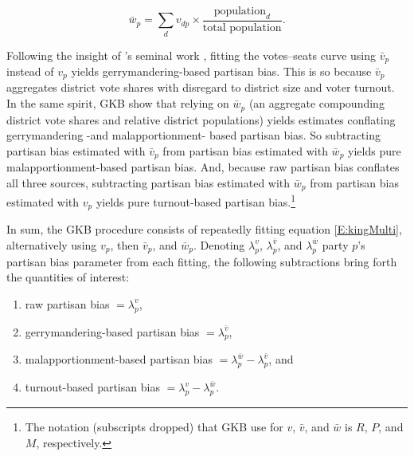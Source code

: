\documentclass[letter,12pt]{article}
\begin{document}
\begin{equation}
\bar{w}_p  = \sum_d v_{dp} \times \frac{\text{population}_d}{\text{total population}}. %
\end{equation}


Following the insight of \citeauthor{tufte1973seatsVotes}'s \citeyearpar{tufte1973seatsVotes} seminal work \citep[further elaborated in][]{gelman.king.1994EvalElSysRedis}, fitting the votes--seats curve using $\bar{v}_p$ instead of $v_p$ yields gerrymandering-based partisan bias. This is so because $\bar{v}_p$ aggregates district vote shares with disregard to district size and voter turnout. In the same spirit, GKB show that relying on $\bar{w}_p$ (an aggregate compounding district vote shares and relative district populations) yields estimates conflating gerrymandering -and malapportionment- based partisan bias. So subtracting partisan bias estimated with $\bar{v}_p$ from partisan bias estimated with $\bar{w}_p$ yields pure malapportionment-based partisan bias. And, because raw partisan bias conflates all three sources, subtracting partisan bias estimated with $\bar{w}_p$ from partisan bias estimated with $v_p$ yields pure turnout-based partisan bias.\footnote{The notation (subscripts dropped) that GKB use for $v$, $\bar{v}$, and $\bar{w}$ is $R$, $P$, and $M$, respectively.}  

In sum, the GKB procedure consists of repeatedly fitting equation \ref{E:kingMulti}, alternatively using $v_p$, then $\bar{v}_p$, and $\bar{w}_p$. Denoting $\lambda_p^v$, $\lambda_p^{\bar{v}}$, and $\lambda_p^{\bar{w}}$ party $p$'s partisan bias parameter from each fitting, the following subtractions bring forth the quantities of interest: 

\begin{enumerate}
\renewcommand{\theenumi}{\alph{enumi}}
\item raw partisan bias $=\lambda_p^v$,
\item gerrymandering-based partisan bias $=\lambda_p^{\bar{v}}$, 
\item malapportionment-based partisan bias $=\lambda_p^{\bar{w}}-\lambda_p^{\bar{v}}$, and
\item turnout-based partisan bias $=\lambda_p^v-\lambda_p^{\bar{w}}$.
\end{enumerate}
\end{document}
